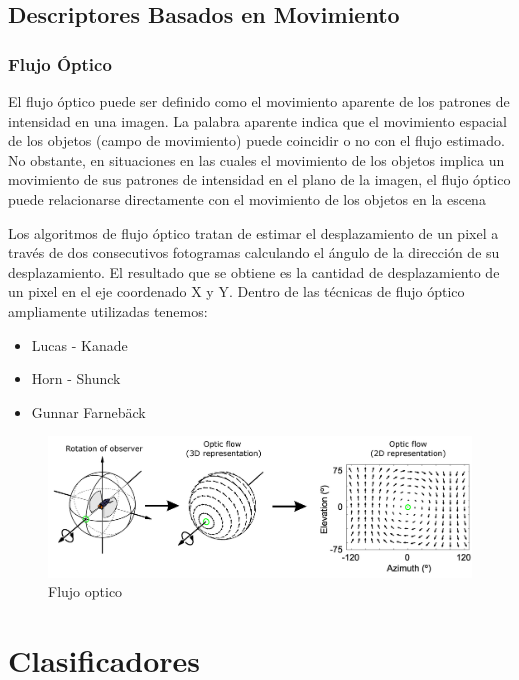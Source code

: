 \documentclass[a4paper,11pt]{report}
\begin{document}
\subsection{Descriptores Basados en Movimiento}
\subsubsection{Flujo Óptico}
El flujo óptico puede ser definido como el movimiento aparente de los patrones de intensidad en una imagen. La palabra aparente indica que el movimiento espacial de los objetos (campo de movimiento) puede coincidir o no con el flujo estimado. No obstante, en situaciones en las cuales el movimiento de los objetos implica un movimiento de sus patrones de intensidad en el plano de la imagen, el flujo óptico puede relacionarse directamente con el movimiento de los objetos en la escena

Los algoritmos de flujo óptico tratan de estimar el desplazamiento de un pixel a través de dos consecutivos fotogramas calculando el ángulo de la dirección de su desplazamiento. El resultado que se obtiene es la cantidad de desplazamiento de un pixel en el eje coordenado X y Y.
Dentro de las técnicas de flujo óptico ampliamente utilizadas tenemos:

\begin{itemize}
	\item Lucas - Kanade 
	\item Horn - Shunck
	\item Gunnar Farnebäck
\end{itemize}

\begin{figure}[h]
 \centering
  \includegraphics[scale=0.5]{opticFlow}
  \caption{Flujo optico }
  \label{fig:Flujo Optico}
\end{figure}



\section{Clasificadores}
\end{document}

